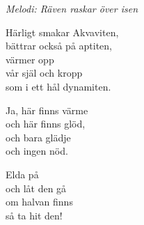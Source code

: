 {\footnotesize\textit{Melodi: Räven raskar över isen}}\par
\vspace{10pt}
Härligt smakar Akvaviten,\\
bättrar också på aptiten,\\
värmer opp\\
vår själ och kropp\\
som i ett hål dynamiten.\par
\vspace{10pt}
Ja, här finns värme\\
och här finns glöd,\\
och bara glädje\\
och ingen nöd.\par
\vspace{10pt}
Elda på\\
och låt den gå\\
om halvan finns\\
så ta hit den!
